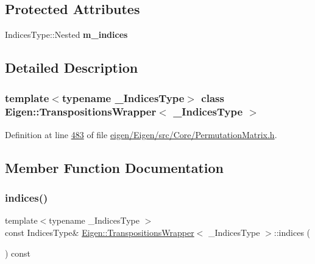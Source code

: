 \subsection*{Protected Attributes}
\begin{DoxyCompactItemize}
\item 
\mbox{\label{class_eigen_1_1_transpositions_wrapper_af6b3c86af896c289a95e6dc1dd0c7706}} 
Indices\+Type\+::\+Nested {\bfseries m\+\_\+indices}
\end{DoxyCompactItemize}


\subsection{Detailed Description}
\subsubsection*{template$<$typename \+\_\+\+Indices\+Type$>$\newline
class Eigen\+::\+Transpositions\+Wrapper$<$ \+\_\+\+Indices\+Type $>$}



Definition at line \hyperlink{eigen_2_eigen_2src_2_core_2_permutation_matrix_8h_source_l00483}{483} of file \hyperlink{eigen_2_eigen_2src_2_core_2_permutation_matrix_8h_source}{eigen/\+Eigen/src/\+Core/\+Permutation\+Matrix.\+h}.



\subsection{Member Function Documentation}
\mbox{\label{class_eigen_1_1_transpositions_wrapper_a5a64081fa7eaa0b02ec10c548505899d}} 
\subsubsection{\texorpdfstring{indices()}{indices()}\hspace{0.1cm}{\footnotesize\ttfamily [1/4]}}
{\footnotesize\ttfamily template$<$typename \+\_\+\+Indices\+Type $>$ \\
const Indices\+Type\& \hyperlink{class_eigen_1_1_transpositions_wrapper}{Eigen\+::\+Transpositions\+Wrapper}$<$ \+\_\+\+Indices\+Type $>$\+::indices (\begin{DoxyParamCaption}{ }\end{DoxyParamCaption}) const\hspace{0.3cm}{\ttfamily [inline]}}

